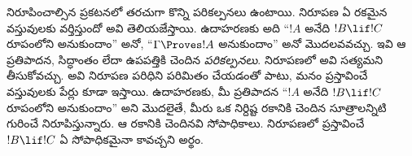 \documentclass[../../../include/open-logic-section]{subfiles}
\begin{document}
నిరూపించాల్సిన ప్రకటనలో తరచుగా కొన్ని పరికల్పనలు ఉంటాయి.
నిరూపణ ఏ రకమైన వస్తువులకు వర్తిస్తుందో అవి తెలియజేస్తాయి.
ఉదాహరణకు అది ``$!A$ అనేది $!B \lif !C$ రూపంలోని
 అనుకుందాం'' అనో, ``$\Gamma \Proves !A$
అనుకుందాం'' అనో మొదలవవచ్చు. ఇవి ఆ ప్రతిపాదన, సిద్ధాంతం లేదా
ఉపపత్తికి చెందిన \emph{పరికల్పనలు}. నిరూపణలో అవి సత్యమని తీసుకోవచ్చు.
అవి నిరూపణ పరిధిని పరిమితం చేయడంతో పాటు, మనం ప్రస్తావించే
వస్తువులకు పేర్లు కూడా ఇస్తాయి. ఉదాహరణకు, మీ ప్రతిపాదన
``$!A$ అనేది $!B \lif !C$ రూపంలోని 
అనుకుందాం'' అని మొదలైతే, మీరు ఒక నిర్దిష్ట రకానికి చెందిన
సూత్రాలన్నిటి గురించే నిరూపిస్తున్నారు. ఆ రకానికి చెందినవి
సోపాధికాలు. నిరూపణలో ప్రస్తావించే $!B \lif !C$ ఏ సోపాధికమైనా
కావచ్చని అర్థం.
\end{document}
